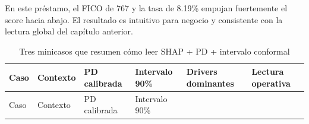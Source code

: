 \documentclass[
  spanish,
  11pt,
  letterpaper,
]{scrbook}
\theoremstyle{plain}
\theoremstyle{remark}
\begin{document}
En este préstamo, el FICO de 767 y la tasa de 8.19\% empujan fuertemente
el score hacia abajo. El resultado es intuitivo para negocio y
consistente con la lectura global del capítulo anterior.

\begin{longtable}[]{@{}
  >{\raggedright\arraybackslash}p{}
  >{\raggedright\arraybackslash}p{}
  >{\raggedleft\arraybackslash}p{}
  >{\raggedright\arraybackslash}p{}
  >{\raggedright\arraybackslash}p{}
  >{\raggedright\arraybackslash}p{}@{}}
\caption{Tres minicasos que resumen cómo leer SHAP + PD + intervalo
conformal}\label{tbl-local-mini-cases}\tabularnewline
\toprule\noalign{}
\begin{minipage}[b]{\linewidth}\raggedright
Caso
\end{minipage} & \begin{minipage}[b]{\linewidth}\raggedright
Contexto
\end{minipage} & \begin{minipage}[b]{\linewidth}\raggedleft
PD calibrada
\end{minipage} & \begin{minipage}[b]{\linewidth}\raggedright
Intervalo 90\%
\end{minipage} & \begin{minipage}[b]{\linewidth}\raggedright
Drivers dominantes
\end{minipage} & \begin{minipage}[b]{\linewidth}\raggedright
Lectura operativa
\end{minipage} \\
\midrule\noalign{}
\endfirsthead
\toprule\noalign{}
\begin{minipage}[b]{\linewidth}\raggedright
Caso
\end{minipage} & \begin{minipage}[b]{\linewidth}\raggedright
Contexto
\end{minipage} & \begin{minipage}[b]{\linewidth}\raggedleft
PD calibrada
\end{minipage} & \begin{minipage}[b]{\linewidth}\raggedright
Intervalo 90\%
\end{minipage} & \begin{minipage}[b]{\linewidth}\raggedright

\end{minipage}
\end{longtable}
\end{document}
